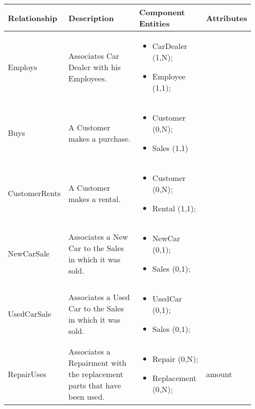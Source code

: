 \begin{longtable}{|p{}|p{} |p{}|p{} |} 
\hline
\textbf{Relationship} & \textbf{Description} & \textbf{Component Entities} & \textbf{Attributes} \\\hline

Employs & Associates Car Dealer with his Employees. & \begin{itemize}
		\vspace{-1em}
		\item CarDealer (1,N);
		\item Employee (1,1);
	\end{itemize}
 & \\\hline

Buys & A Customer makes a purchase. & \begin{itemize}
		\vspace{-1em}
		\item Customer (0,N);
		\item Sales (1,1)
	\end{itemize}
 & \\\hline

CustomerRents & A Customer makes a rental. & \begin{itemize}
		\vspace{-1em}
		\item Customer (0,N);
		\item Rental (1,1);
	\end{itemize}
 & \\\hline

NewCarSale & Associates a New Car to the Sales in which it was sold. & \begin{itemize}
		\vspace{-1em}
		\item NewCar (0,1);
		\item Sales (0,1);
	\end{itemize}
 & \\\hline

UsedCarSale & Associates a Used Car to the Sales in which it was sold. & \begin{itemize}
		\vspace{-1em}
		\item UsedCar (0,1);
		\item Sales (0,1);
	\end{itemize}
 & \\\hline

RepairUses & Associates a Repairment with the replacement parts that have been used. & \begin{itemize}
	\vspace{-1em}
	\item Repair (0,N);
	\item Replacement (0,N);
\end{itemize}
& amount \\\hline


\end{longtable}
